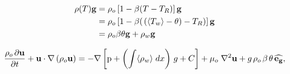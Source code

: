 
\begin{equation}
\begin{aligned}
\rho(T) \mathbf{g} &= \rho_o \left[ 1 - \beta (T - T_R) \right] \mathbf{g} \\
				   &= \rho_o \left[ 1 - \beta ( \hspace{0.5mm} (\langle T_w \rangle - \theta) - T_R) \right] \mathbf{g} \\
 		           &= \rho_o \beta \theta \mathbf{g} + \rho_w \mathbf{g}
\end{aligned}
\label{eq:bussinesq}
\end{equation}

\begin{equation}
\frac{ \rho_o \hspace{0.5mm} \partial \mathbf{u}}{\partial t} + \mathbf{u} \cdot \nabla  \left( \rho_o \mathbf{u} \right) = -\nabla \left[ \text{p} + \left( \int \langle \rho_{w} \rangle \hspace{1mm} dx \right) \hspace{0.5mm} g + C \right] + \mu_o \hspace{1mm} {\nabla}^2 \mathbf{u}  + g \hspace{0.5mm} \rho_o \hspace{0.5mm} \beta \hspace{0.5mm} \theta \hspace{0.5mm} \mathbf{\widehat{e_g}},
\label{eq:mom_rewrite}  
\end{equation}
 

